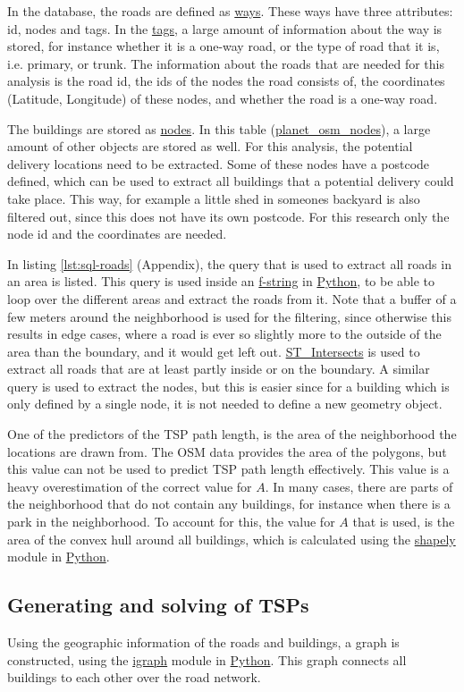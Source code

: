 \documentclass[12pt]{article}
\numberwithin{equation}{section}
\newcommand{\1}[1]{\,I_{#1}} %
\begin{document}
In the database, the roads are defined as \url{ways}. These ways have three
attributes: id, nodes and tags. In the \url{tags}, a large amount of 
information about the way is stored, for instance whether it is a 
one-way road, or the type of road that it is, i.e. primary, or trunk.
The information about the roads that are needed for this analysis is the
road id, the ids of the nodes the road consists of, the coordinates
(Latitude, Longitude) of these nodes, and whether the road is a one-way
road.

The buildings are stored as \url{nodes}. In this table (\url{planet_osm_nodes}),
a large amount of other objects are stored as well. For this analysis,
the potential delivery locations need to be extracted. Some of these 
nodes have a postcode defined, which can be used to extract all buildings
that a potential delivery could take place. This way, for example a little shed in 
someones backyard is also filtered out, since this does not have its own 
postcode. For this research only the node id and the coordinates are
needed.

In listing \ref{lst:sql-roads} (Appendix), the query that is used to extract
all roads in an area is listed. This query is used inside an \url{f-string}
in \url{Python}, to be able to loop over the different areas and extract
the roads from it. Note that a buffer of a few meters around the neighborhood
is used for the filtering, since otherwise this results in edge cases,
where a road is ever so slightly more to the outside of the area than the boundary,
and it would get left out. \url{ST_Intersects} is used to extract all roads
that are at least partly inside or on the boundary. A similar query is used 
to extract the nodes, but this is easier since for a building which is only
defined by a single node, it is not needed to define a new geometry object.

One of the predictors of the TSP path length, is the area of the neighborhood
the locations are drawn from. The OSM data provides the area of the polygons,
but this value can not be used to predict TSP path length effectively.
This value is a heavy overestimation of the correct value for $A$.
In many cases, there are parts of the neighborhood that do not contain
any buildings, for instance when there is a park in the neighborhood. To
account for this, the value for $A$ that is used, is the area of the convex
hull around all buildings, which is calculated using the \url{shapely}
module in \url{Python}.
\subsection{Generating and solving of TSPs}
Using the geographic information of the roads and buildings, a graph
is constructed, using the \url{igraph} module in \url{Python}. This graph
connects all buildings to each other over the road network.
\end{document}
